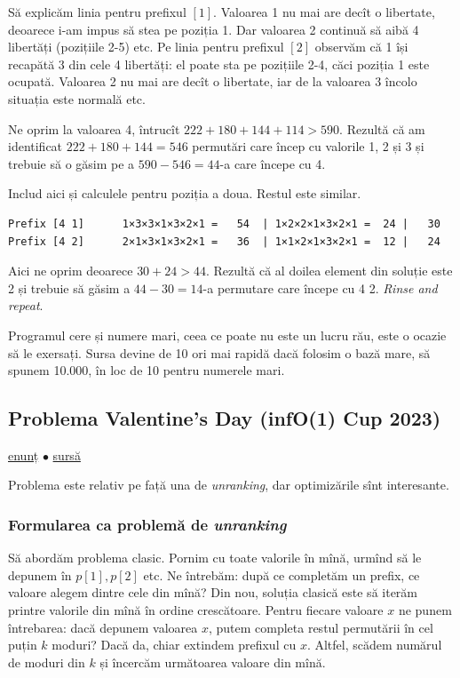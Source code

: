 \documentclass[../main.tex]{subfiles}
\begin{document}
Să explicăm linia pentru prefixul $[1]$. Valoarea 1 nu mai are decît o libertate, deoarece i-am impus să stea pe poziția 1. Dar valoarea 2 continuă să aibă 4 libertăți (pozițiile 2-5) etc. Pe linia pentru prefixul $[2]$ observăm că 1 își recapătă 3 din cele 4 libertăți: el poate sta pe pozițiile 2-4, căci poziția 1 este ocupată. Valoarea 2 nu mai are decît o libertate, iar de la valoarea 3 încolo situația este normală etc.

Ne oprim la valoarea 4, întrucît $222 + 180 + 144 + 114 > 590$. Rezultă că am identificat $222 + 180 + 144 = 546$ permutări care încep cu valorile 1, 2 și 3 și trebuie să o găsim pe a $590-546=44$-a care începe cu 4.

Includ aici și calculele pentru poziția a doua. Restul este similar.

\begin{verbatim}
Prefix [4 1]      1×3×3×1×3×2×1 =   54  | 1×2×2×1×3×2×1 =  24 |   30
Prefix [4 2]      2×1×3×1×3×2×1 =   36  | 1×1×2×1×3×2×1 =  12 |   24
\end{verbatim}

Aici ne oprim deoarece $30+24 > 44$. Rezultă că al doilea element din soluție este 2 și trebuie să găsim a $44-30=14$-a permutare care începe cu 4 2. \textit{Rinse and repeat}.

Programul cere și numere mari, ceea ce poate nu este un lucru rău, este o ocazie să le exersați. Sursa devine de 10 ori mai rapidă dacă folosim o bază mare, să spunem 10.000, în loc de 10 pentru numerele mari.

\subsection{Problema Valentine's Day (infO(1) Cup 2023)}
\label{problem:valentines-day}

\href{https://kilonova.ro/problems/428/}{enunț}
$\bullet$
\hyperref[code:valentines-day]{sursă}

Problema este relativ pe față una de \textit{unranking}, dar optimizările sînt interesante.

\subsubsection*{Formularea ca problemă de \textit{unranking}}

Să abordăm problema clasic. Pornim cu toate valorile în mînă, urmînd să le depunem în $p[1], p[2]$ etc. Ne întrebăm: după ce completăm un prefix, ce valoare alegem dintre cele din mînă?  Din nou, soluția clasică este să iterăm printre valorile din mînă în ordine crescătoare. Pentru fiecare valoare $x$ ne punem întrebarea: dacă depunem valoarea $x$, putem completa restul permutării în cel puțin $k$ moduri? Dacă da, chiar extindem prefixul cu $x$. Altfel, scădem numărul de moduri din $k$ și încercăm următoarea valoare din mînă.
\end{document}
